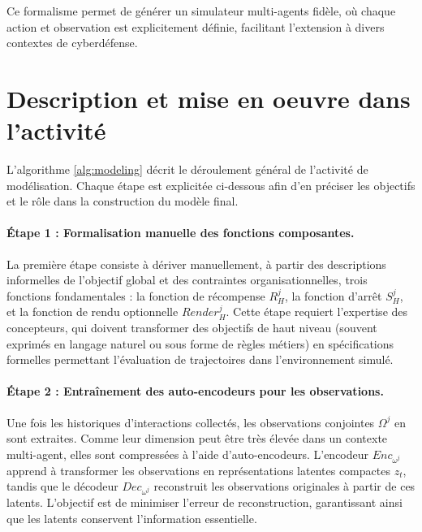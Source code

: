 Ce formalisme permet de générer un simulateur multi-agents fidèle, où chaque action et observation est explicitement définie, facilitant l’extension à divers contextes de cyberdéfense.


\section{Description et mise en oeuvre dans l'activité}

L’algorithme \ref{alg:modeling} décrit le déroulement général de l’activité de modélisation.
Chaque étape est explicitée ci-dessous afin d’en préciser les objectifs et le rôle dans la construction du modèle final.

\paragraph{Étape 1 : Formalisation manuelle des fonctions composantes.}
La première étape consiste à dériver manuellement, à partir des descriptions informelles de l’objectif global et des contraintes organisationnelles, trois fonctions fondamentales : la fonction de récompense $R^j_H$, la fonction d’arrêt $S^j_H$, et la fonction de rendu optionnelle $Render^j_H$.
Cette étape requiert l’expertise des concepteurs, qui doivent transformer des objectifs de haut niveau (souvent exprimés en langage naturel ou sous forme de règles métiers) en spécifications formelles permettant l’évaluation de trajectoires dans l’environnement simulé.

\paragraph{Étape 2 : Entraînement des auto-encodeurs pour les observations.}
Une fois les historiques d’interactions collectés, les observations conjointes $\Omega^j$ en sont extraites.
Comme leur dimension peut être très élevée dans un contexte multi-agent, elles sont compressées à l’aide d’auto-encodeurs.
L’encodeur $Enc_{\omega^j}$ apprend à transformer les observations en représentations latentes compactes $z_t$, tandis que le décodeur $Dec_{\omega^j}$ reconstruit les observations originales à partir de ces latents.
L’objectif est de minimiser l’erreur de reconstruction, garantissant ainsi que les latents conservent l’information essentielle.

